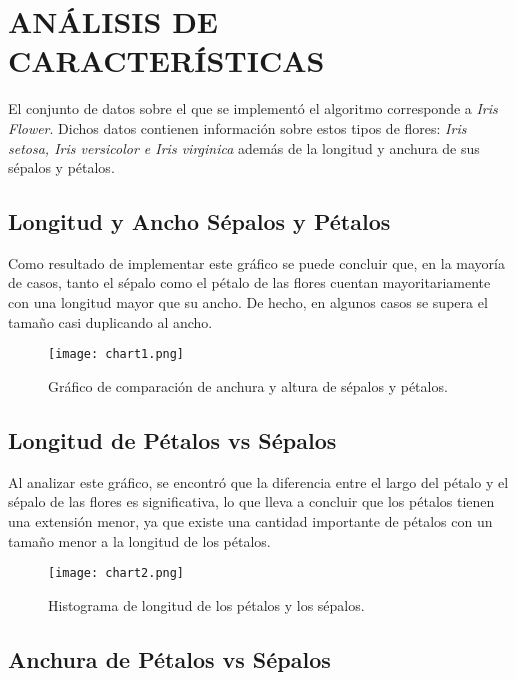 \documentclass{article_saj}
\begin{document}
\section{ANÁLISIS DE CARACTERÍSTICAS}

\indent

El conjunto de datos sobre el que se implementó el algoritmo corresponde a \textit{Iris Flower}. Dichos datos contienen información sobre estos tipos de flores: \textit{Iris setosa, Iris versicolor e Iris virginica} además de la longitud y anchura de sus sépalos y pétalos. 

\subsection{Longitud y Ancho Sépalos y Pétalos}

\indent
Como resultado de implementar este gráfico se puede concluir que, en la mayoría de casos, tanto el sépalo como el pétalo de las flores cuentan mayoritariamente con una longitud mayor que su ancho. De hecho, en algunos casos se supera el tamaño casi duplicando al ancho.  

\begin{figure}[H]
\centerline{\texttt{[image: chart1.png]}}
\caption{Gráfico de comparación de anchura y altura de sépalos y pétalos.}
\label{fig1}
\end{figure}


\subsection{Longitud de Pétalos vs Sépalos}

\indent

Al analizar este gráfico, se encontró que la diferencia entre el largo del pétalo y el sépalo de las flores es significativa, lo que lleva a concluir que los pétalos tienen una extensión menor, ya que existe una cantidad importante de pétalos con un tamaño menor a la longitud de los pétalos. 

\begin{figure}[H]
\centerline{\texttt{[image: chart2.png]}}
\caption{Histograma de longitud de los pétalos y los sépalos.}
\label{fig2}
\end{figure}

\subsection{Anchura de Pétalos vs Sépalos}
\end{document}
